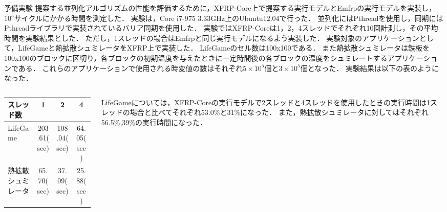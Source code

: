 \documentclass[dvipdfmx,final,t,10pt]{beamer}
\begin{document}
\begin{frame}[fragile]
    \begin{block}{予備実験}
        \vskip 0.3cm
            提案する並列化アルゴリズムの性能を評価するために，XFRP-Core上で提案する実行モデルとEmfrpの実行モデルを実装し，$10^5$サイクルにかかる時間を測定した．
            実験は，Core i7-975 3.33GHz上のUbuntu12.04で行った．
            並列化にはPthreadを使用し，同期にはPthreadライブラリで実装されているバリア同期を使用した．
            実験ではXFRP-Coreは1，2，4スレッドでそれぞれ10回計測し，その平均時間を実験結果とした．
            ただし，1スレッドの場合はEmfrpと同じ実行モデルになるよう実装した．
            実験対象のアプリケーションとして，LifeGameと熱拡散シュミレータをXFRP上で実装した．
            LifeGameのセル数は100x100である．
            また熱拡散シュミレータは鉄板を100x100のブロックに区切り，各ブロックの初期温度を与えたときに一定時間後の各ブロックの温度をシュミレートするアプリケーションである．
            これらのアプリケーションで使用される時変値の数はそれぞれ$5\times10^5$個と$3\times10^5$個となった．
            実験結果は以下の表のようになった．
        \begin{columns}
            \begin{column}{0.55\textwidth}
                \vskip -0.3cm
                \begin{table}
                    \begin{tabular}{|l|c|c|c|} \hline
                        スレッド数 &1 & 2 & 4 \\ \hline
                        LifeGame & 203.61(sec) & 108.04(sec) & 64.05(sec) \\ \hline
                        熱拡散シュミレータ & 65.70(sec) & 37.09(sec) & 25.88(sec) \\ \hline
                    \end{tabular}
                \end{table}
            \end{column}
            \begin{column}{0.4\textwidth}
                LifeGameについては，XFRP-Coreの実行モデルで2スレッドと4スレッドを使用したときの実行時間は1スレッドの場合と比べてそれぞれ53.0\%と31\%になった．
                また，熱拡散シュミレータに対してはそれぞれ56.5\%,39\%の実行時間になった．
            \end{column}
        \end{columns} 
        \vskip -0.2cm
    \end{block}
\end{frame}
\end{document}
